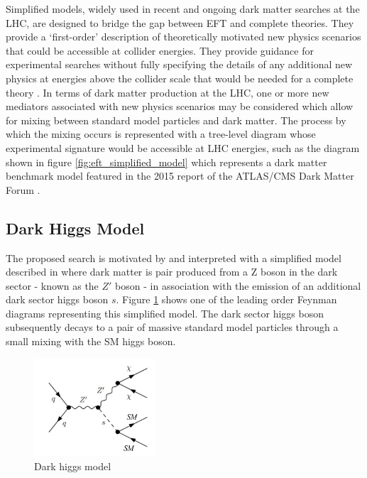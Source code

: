 \documentclass[12pt]{article}
\begin{document}
Simplified models, widely used in recent and ongoing dark matter searches at the LHC, are designed to bridge the gap between EFT and complete theories. They provide a `first-order' description of theoretically motivated new physics scenarios that could be accessible at collider energies. They provide guidance for experimental searches without fully specifying the details of any additional new physics at energies above the collider scale that would be needed for a complete theory \cite{DM_colliders}. In terms of dark matter production at the LHC, one or more new mediators associated with new physics scenarios may be considered which allow for mixing between standard model particles and dark matter. The process by which the mixing occurs is represented with a tree-level diagram whose experimental signature would be accessible at LHC energies, such as the diagram shown in figure \ref{fig:eft_simplified_model} which represents a dark matter benchmark model featured in the 2015 report of the ATLAS/CMS Dark Matter Forum \cite{dm_forum}.

\subsection{Dark Higgs Model}

The proposed search is motivated by and interpreted with a simplified model described in \cite{dark_higgs} where dark matter is pair produced from a Z boson in the dark sector - known as the $Z'$ boson - in association with the emission of an additional dark sector higgs boson $s$. Figure \ref{fig:signal_model} shows one of the leading order Feynman diagrams representing this simplified model. The dark sector higgs boson subsequently decays to a pair of massive standard model particles through a small mixing with the SM higgs boson. 

\begin{figure}[H]
	\centering
	\includegraphics[width=0.4\textwidth]{figures/Signal_generic.png}
	\caption[]{Dark higgs model}
	\label{fig:signal_model}
\end{figure}
\end{document}
